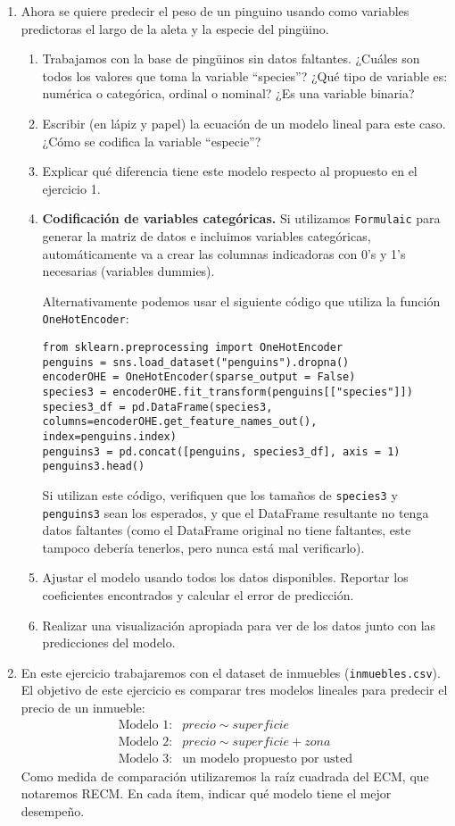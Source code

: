 \documentclass[a4paper,11pt]{article}
\theoremstyle{definition}
\begin{document}
\begin{enumerate}
\item Ahora se quiere predecir el peso de un pinguino usando como variables predictoras el largo de la aleta y la especie del ping\"uino.
\begin{enumerate}
\item Trabajamos con la base de ping\"uinos sin datos faltantes. ¿Cu\'ales son todos los valores que toma la variable ``species''? ¿Qu\'e tipo de variable es: numérica o categórica, ordinal o nominal? ¿Es una variable binaria?
\item Escribir (en lápiz y papel) la ecuación de un modelo lineal para este caso. ¿Cómo se codifica la variable “especie”?
\item Explicar qué diferencia tiene este modelo respecto al propuesto en el ejercicio 1.
\item \textbf{Codificación de variables categóricas.}  Si utilizamos \lstinline{Formulaic} para generar la matriz de datos e incluimos variables categóricas, automáticamente va a crear las columnas indicadoras con 0's y 1's necesarias (variables dummies).

    Alternativamente podemos usar el siguiente código que utiliza la función \lstinline{OneHotEncoder}:
\begin{lstlisting}
from sklearn.preprocessing import OneHotEncoder
penguins = sns.load_dataset("penguins").dropna()
encoderOHE = OneHotEncoder(sparse_output = False)
species3 = encoderOHE.fit_transform(penguins[["species"]])
species3_df = pd.DataFrame(species3, columns=encoderOHE.get_feature_names_out(), index=penguins.index)
penguins3 = pd.concat([penguins, species3_df], axis = 1)
penguins3.head()
\end{lstlisting}

Si utilizan este código, verifiquen que los tama\~nos de \lstinline{species3} y \lstinline{penguins3} sean los esperados, y que el DataFrame resultante no tenga datos faltantes (como el DataFrame original no tiene faltantes, este tampoco debería tenerlos, pero nunca está mal verificarlo).

\item Ajustar el modelo usando todos los datos disponibles. Reportar los coeficientes encontrados y calcular el error de predicción.
\item Realizar una visualización apropiada para ver de los datos junto con las predicciones del modelo.
\end{enumerate}

\item En este ejercicio trabajaremos con el dataset de inmuebles (\verb|inmuebles.csv|). El objetivo de este ejercicio es comparar tres modelos lineales para predecir el precio de un inmueble:
\[
\begin{array}{rl}
    \text{Modelo 1:} &  precio \sim superficie \\
    \text{Modelo 2:} &  precio \sim superficie + zona \\
    \text{Modelo 3:} &  \text{un modelo propuesto por usted}
\end{array}
\]
Como medida de comparación utilizaremos la raíz cuadrada del ECM, que notaremos RECM. En cada ítem, indicar qué modelo tiene el mejor desempeño.


\end{enumerate}
\end{document}
